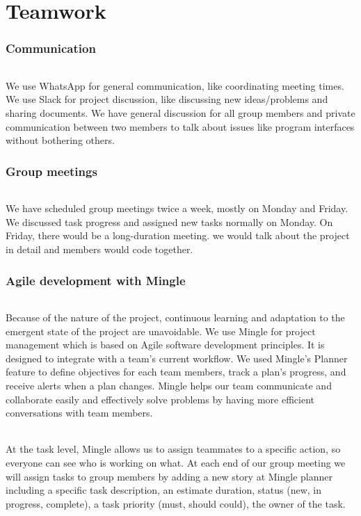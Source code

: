 \documentclass[a4paper,11pt,titlepage]{article}
\begin{document}
\part{Teamwork}
\section{Communication}
\paragraph{}
We use WhatsApp for general communication, like coordinating meeting times. We use Slack for project discussion, like discussing new ideas/problems and sharing documents. We have general discussion for all group members and private communication between two members to talk about issues like program interfaces without bothering others.

\section{Group meetings}
\paragraph{}
We have scheduled group meetings twice a week, mostly on Monday and Friday. We discussed task progress and assigned new tasks normally on Monday. On Friday, there would be a long-duration meeting. we would talk about the project in detail and members would code together.
\section{Agile development with Mingle}
\paragraph{}
Because of the nature of the project, continuous learning and adaptation to the emergent state of the project are unavoidable. We use Mingle for project management which is based on Agile software development principles. It is designed to integrate with a team's current workflow. We used Mingle's Planner feature to define objectives for each team members, track a plan's progress, and receive alerts when a plan changes. Mingle helps our team communicate and collaborate easily and effectively solve problems by having more efficient conversations with team members.
\paragraph{}
At the task level, Mingle allows us to assign teammates to a specific action, so everyone can see who is working on what. At each end of our group meeting we will assign tasks to group members by adding a new story at Mingle planner including a specific task description, an estimate duration, status (new, in progress, complete), a task priority (must, should could), the owner of the task. 
\end{document}
